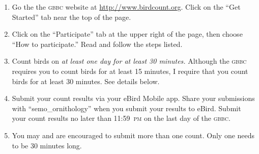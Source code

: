 \documentclass[11pt]{article}
\begin{document}
\begin{enumerate}
	\item Go the the \textsc{gbbc} website at \url{http://www.birdcount.org}. Click on the “Get Started” tab near the top of the page.

	\item Click on the “Participate” tab at the upper right of the page, then choose “How to participate.” Read and follow the steps listed.
	
	  
	
	
	
	\item Count birds on \emph{at least one day for at least 30 minutes.} Although the \textsc{gbbc} requires you to count birds for at least 15 minutes, I require that you count birds for at least 30 minutes. See details below.

	\item Submit your count results via your eBird Mobile app. Share your submissions with “semo\_ornithology” when you submit your results to eBird. Submit your count results no later than 11:59~\textsc{pm} on the last day of the \textsc{gbbc}.
	
	
	\item You may and are encouraged to submit more than one count. Only one needs to be 30 minutes long.
    
\end{enumerate}
\end{document}
